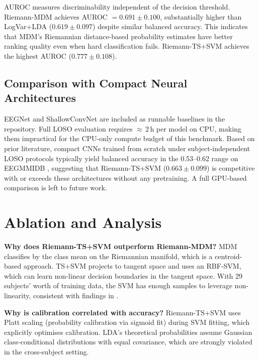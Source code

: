 \documentclass[conference]{IEEEtran}
\begin{document}
AUROC measures discriminability independent of the decision threshold.
Riemann-MDM achieves AUROC $= 0.691 \pm 0.100$, substantially higher
than LogVar+LDA ($0.619 \pm 0.097$) despite similar balanced accuracy.
This indicates that MDM's Riemannian distance-based probability estimates
have better ranking quality even when hard classification fails. Riemann-TS+SVM
achieves the highest AUROC ($0.777 \pm 0.108$).

\subsection{Comparison with Compact Neural Architectures}

EEGNet \cite{lawhern2018eegnet} and ShallowConvNet \cite{schirrmeister2017deep}
are included as runnable baselines in the repository. Full LOSO evaluation
requires $\approx$\,2\,h per model on CPU, making them impractical for
the CPU-only compute budget of this benchmark. Based on prior literature,
compact CNNs trained from scratch under subject-independent LOSO protocols
typically yield balanced accuracy in the 0.53--0.62 range on EEGMMIDB
\cite{lawhern2018eegnet, schirrmeister2017deep}, suggesting that
Riemann-TS+SVM ($0.663 \pm 0.099$) is competitive with or exceeds these
architectures without any pretraining. A full GPU-based comparison is
left to future work.

\section{Ablation and Analysis}
\label{sec:ablation}

\textbf{Why does Riemann-TS+SVM outperform Riemann-MDM?}
MDM classifies by the class mean on the Riemannian manifold, which is a
centroid-based approach. TS+SVM projects to tangent space and uses an RBF-SVM,
which can learn non-linear decision boundaries in the tangent space. With 29
subjects' worth of training data, the SVM has enough samples to leverage
non-linearity, consistent with findings in \cite{congedo2017riemannian}.

\textbf{Why is calibration correlated with accuracy?}
Riemann-TS+SVM uses Platt scaling (probability calibration via sigmoid fit)
during SVM fitting, which explicitly optimises calibration. LDA's theoretical
probabilities assume Gaussian class-conditional distributions with equal
covariance, which are strongly violated in the cross-subject setting.
\end{document}
